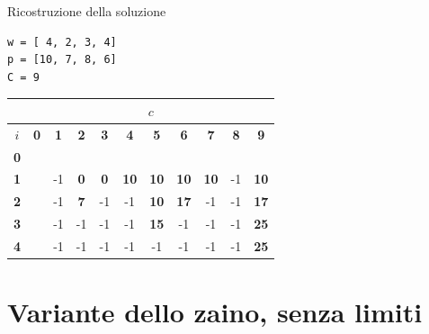 \begin{frame}[fragile]{Ricostruzione della soluzione}

\vspace{-9pt}

\begin{lstlisting}
w = [ 4, 2, 3, 4]
p = [10, 7, 8, 6]
C = 9  
\end{lstlisting}

\bigskip
\begin{tabular}{|c|c|c|c|c|c|c|c|c|c|c|}
\hline
& \multicolumn{10}{c|}{$c$} \\\hline
$i$ & \textbf{0} & \textbf{1} & \textbf{2} & \textbf{3} & \textbf{4} & \textbf{5} & \textbf{6} & \textbf{7} & \textbf{8} & \textbf{9}  \\\hline
\bf{0} &   &    &    &    &    &    &    &    &    &    \\\hline
\bf{1} &   &  -1 &  \alert{\bf 0} &  \alert{\bf 0} & \alert{\bf 10} & \alert{\bf 10} & \alert{\bf 10} & \alert{\bf 10} & -1 & \alert{\bf 10} \\\hline
\bf{2} &   &  -1 &  \alert{\bf 7} & -1 & -1 & \alert{\bf 10} & \alert{\bf 17} & -1 & -1 & \alert{\bf 17} \\\hline
\bf{3} &   &  -1 &  -1 &  -1 & -1 & \alert{\bf 15} & -1 & -1 & -1 & \alert{\bf 25} \\\hline
\bf{4} &   &  -1 &  -1 &  -1 & -1 & -1 & -1 & -1 & -1 & \alert{\bf 25} \\\hline  
\end{tabular}  

\end{frame}


\section{Variante dello zaino, senza limiti}


